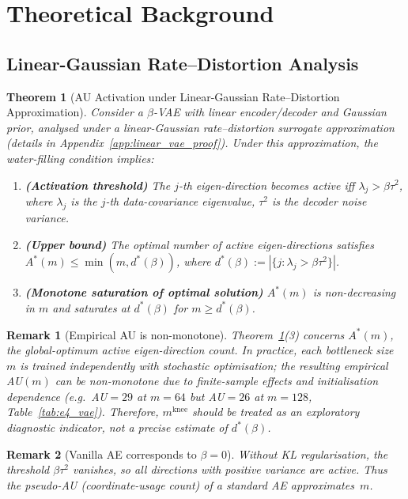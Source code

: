 \documentclass[11pt,a4paper]{article}
\newtheorem{theorem}{Theorem}
\newtheorem{remark}{Remark}
\newcommand{\mknee}{m^{\mathrm{knee}}}
\begin{document}
\section{Theoretical Background}\label{sec:theory}

\subsection{Linear-Gaussian Rate--Distortion Analysis}
\label{sec:theory_lva}

\begin{theorem}[AU Activation under Linear-Gaussian Rate--Distortion Approximation]
\label{thm:linear_vae}
Consider a $\beta$-VAE with linear encoder/decoder and Gaussian prior, analysed
under a linear-Gaussian rate--distortion surrogate approximation
(details in Appendix~\ref{app:linear_vae_proof}).
Under this approximation, the water-filling condition implies:
\begin{enumerate}
\item \textbf{(Activation threshold)} The $j$-th eigen-direction becomes active iff
  $\lambda_j>\beta\tau^2$,
  where $\lambda_j$ is the $j$-th data-covariance eigenvalue, $\tau^2$ is the decoder noise variance.
\item \textbf{(Upper bound)} The optimal number of active eigen-directions satisfies
  $A^*(m)\leq\min(m,d^*(\beta))$, where $d^*(\beta):=|\{j:\lambda_j>\beta\tau^2\}|$.
\item \textbf{(Monotone saturation of optimal solution)}
  $A^*(m)$ is non-decreasing in $m$ and saturates at $d^*(\beta)$ for $m\geq d^*(\beta)$.
\end{enumerate}
\end{theorem}

\begin{remark}[Empirical AU is non-monotone]
Theorem~\ref{thm:linear_vae}(3) concerns $A^*(m)$, the global-optimum active
eigen-direction count.  In practice, each bottleneck size $m$ is trained
independently with stochastic optimisation; the resulting empirical AU$(m)$ can
be non-monotone due to finite-sample effects and initialisation dependence
(e.g.\ AU$=29$ at $m=64$ but AU$=26$ at $m=128$, Table~\ref{tab:e4_vae}).
Therefore, $\mknee$ should be treated as an exploratory diagnostic indicator,
not a precise estimate of $d^*(\beta)$.
\end{remark}

\begin{remark}[Vanilla AE corresponds to $\beta=0$]
Without KL regularisation, the threshold $\beta\tau^2$ vanishes, so all
directions with positive variance are active.  Thus the pseudo-AU
(coordinate-usage count) of a standard AE approximates~$m$.
\end{remark}
\end{document}
